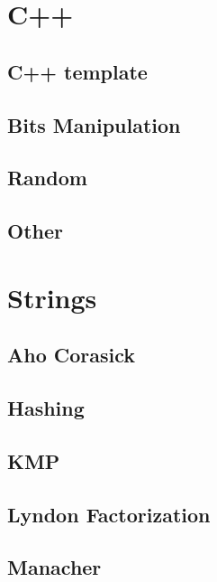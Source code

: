 \section{C++}
\subsection{C++ template}
\raggedbottom
\hrulefill
\subsection{Bits Manipulation}
\raggedbottom
\hrulefill
\subsection{Random}
\raggedbottom
\hrulefill
\subsection{Other}
\raggedbottom
\hrulefill

\section{Strings}
\subsection{Aho Corasick}
\raggedbottom
\hrulefill
\subsection{Hashing}
\raggedbottom
\hrulefill
\subsection{KMP}
\raggedbottom
\hrulefill
\subsection{Lyndon Factorization}
\raggedbottom
\hrulefill
\subsection{Manacher}
\raggedbottom
\hrulefill
